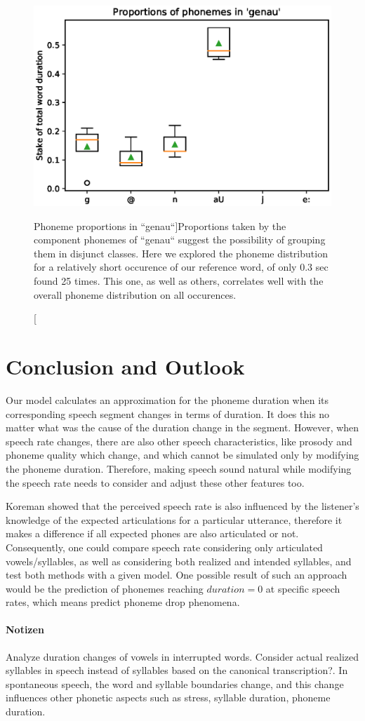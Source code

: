 \documentclass[a4paper]{scrreprt}
\begin{document}
\begin{figure}[htbp]
	\includegraphics[width=.55\linewidth]{../Graphen/Sound_boxplot_genau.eps}
	\centering
	\caption[Phoneme proportions in ``genau``]{Proportions taken by the component phonemes of ``genau`` suggest the possibility of grouping them in disjunct classes. Here we explored the phoneme distribution for a relatively short occurence of our reference word, of only 0.3 sec found 25 times. This one, as well as others, correlates well with the overall phoneme distribution on all occurences.}
	\label{fig:boxplot_genau}
\end{figure}

\chapter{Conclusion and Outlook}
Our model calculates an approximation for the phoneme duration when its corresponding speech segment changes in terms of duration. It does this no matter what was the cause of the duration change in the segment. However, when speech rate changes, there are also other speech characteristics, like prosody and phoneme quality which change, and which cannot be simulated only by modifying the phoneme duration. Therefore, making speech sound natural while modifying the speech rate needs to consider and adjust these other features too.

Koreman showed \cite{Koreman_2006} that the perceived speech rate is also influenced by the listener's knowledge of the expected articulations for a particular utterance, therefore it makes a difference if all expected phones are also articulated or not. Consequently, one could compare speech rate considering only articulated vowels/syllables, as well as considering both realized and intended syllables, and test both methods with a given model. One possible result of such an approach would be the prediction of phonemes reaching $duration = 0$ at specific speech rates, which means predict phoneme drop phenomena.

\subsubsection*{Notizen}
Analyze duration changes of vowels in interrupted words.
Consider actual realized syllables in speech instead of syllables based on the canonical transcription?. In spontaneous speech, the word and syllable boundaries change, and this change influences other phonetic aspects such as stress, syllable duration, phoneme duration.

\printbibliography
\end{document}
